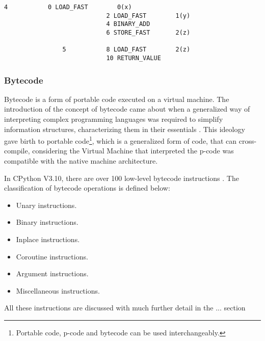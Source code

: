 {				\begin{lstlisting}[numbers=none, caption=Disassembly of Listing \ref{lst:sourcecode}]
				4       	0 LOAD_FAST        0(x)
							2 LOAD_FAST        1(y)
							4 BINARY_ADD
							6 STORE_FAST       2(z)
				
				5       	8 LOAD_FAST        2(z)
							10 RETURN_VALUE
				\end{lstlisting}\label{lst:dis_example}

			\subsubsection*{Bytecode}
			\label{subsubsec:bytecode}
			\par Bytecode is a form of portable code executed on a virtual machine. 
			The introduction of the concept of bytecode came about when a generalized way 
			 of interpreting complex programming languages was required to simplify information structures, characterizing them in their essentials \cite[]{landin1964mechanical}.
			 This ideology gave birth to portable code\footnote{Portable code, p-code and bytecode can be used interchangeably.}, which is a generalized form of code, that can cross-compile, considering
			 the Virtual Machine that interpreted the p-code was compatible with the native machine architecture. 
			 \par In CPython V3.10, there are over 100 low-level bytecode instructions \cite[]{pythonofficial2022docsdismodule}. The classification of bytecode operations is defined below:
			\begin{itemize}
				\item Unary instructions.
				\item Binary instructions.
				\item Inplace instructions.
				\item Coroutine instructions.
				\item Argument instructions.
				\item Miscellaneous instructions.
			\end{itemize}
			\par All these instructions are discussed with much further detail in the ... section 
			
}
